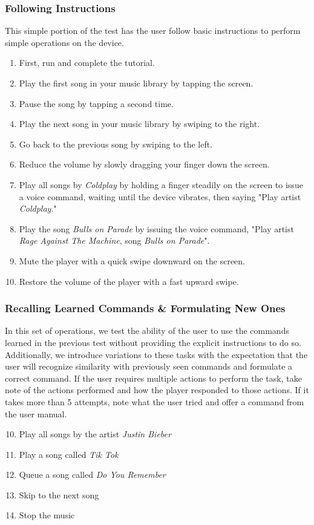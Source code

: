 \documentclass[12pt,letterpaper]{article}
\begin{document}
\subsubsection{Following Instructions}
This simple portion of the test has the user follow basic instructions to perform simple operations on the device.
\begin{enumerate}
\item First, run and complete the tutorial.
\item Play the first song in your music library by tapping the screen.
\item Pause the song by tapping a second time.
\item Play the next song in your music library by swiping to the right.
\item Go back to the previous song by swiping to the left.
\item Reduce the volume by slowly dragging your finger down the screen.
\item Play all songs by \textit{Coldplay} by holding a finger steadily on the screen to issue a voice command, waiting until the device vibrates, then saying "Play artist \textit{Coldplay}."
\item Play the song \textit{Bulls on Parade} by issuing the voice command, "Play artist \textit{Rage Against The Machine}, song \textit{Bulls on Parade}".
\item Mute the player with a quick swipe downward on the screen.
\item Restore the volume of the player with a fast upward swipe.
\end{enumerate}

\subsubsection{Recalling Learned Commands \& Formulating New Ones}
In this set of operations, we test the ability of the user to use the commands learned in the previous test without providing the explicit instructions to do so. Additionally, we introduce variations to these tasks with the expectation that the user will recognize similarity with previously seen commands and formulate a correct command. If the user requires multiple actions to perform the task, take note of the actions performed and how the player responded to those actions. If it takes more than 5 attempts, note what the user tried and offer a command from the user manual.
\begin{enumerate}
\setcounter{enumi}{9}
\item Play all songs by the artist \textit{Justin Bieber}
\item Play a song called \textit{Tik Tok}
\item Queue a song called \textit{Do You Remember}
\item Skip to the next song
\item Stop the music
\end{enumerate}
\end{document}
